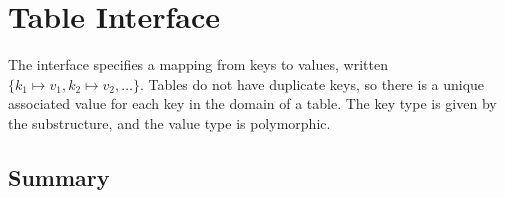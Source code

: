\chapter{Table Interface}
\label{ch:table-interface}

\begin{cluster}
\label{grp:grm:table-interface::table}

\begin{gram}
\label{grm:table-interface::table}
\label{ch:table-interface}
\begin{preamble}
The  interface specifies a mapping from keys to values, written
$\{k_1 \mapsto v_1, k_2 \mapsto v_2, \ldots\}$. Tables do not have duplicate
keys, so there is a unique associated value for each key in the domain of
a table. The key type is given by the  substructure, and the value
type is polymorphic.
\end{preamble}

\end{gram}
\end{cluster}


\section{Summary}
\label{sec:table-interface::summary}


